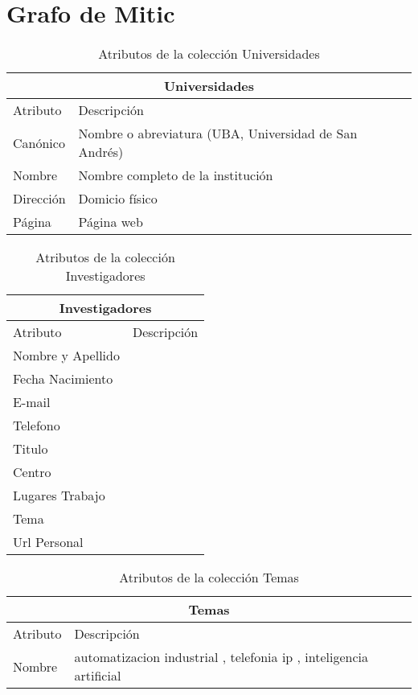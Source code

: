 \chapter{Grafo de Mitic}
\label{chap:db}

\begin{center}
\begin{table}[H]
\centering
\begin{tabular}{| l | l |}
\hline
\multicolumn{2}{|c|}{Universidades} \\ \hline
Atributo & Descripción \\ \hline
Canónico & Nombre o abreviatura (UBA, Universidad de San Andrés)\\ \hline
Nombre& Nombre completo de la institución\\ \hline
Dirección & Domicio físico\\ \hline
Página & Página web\\ \hline
\end{tabular}
\caption{Atributos de la colección Universidades}
\label{table:universidades}
\end{table}
\end{center}

\begin{center}
\begin{table}[H]
\centering
\begin{tabular}{| l | l |}
\hline
\multicolumn{2}{|c|}{Investigadores} \\ \hline
Atributo & Descripción \\ \hline
	Nombre y Apellido & \\ \hline
	Fecha Nacimiento & \\ \hline
	E-mail & \\ \hline
  Telefono & \\ \hline
  Titulo & \\ \hline
  Centro & \\ \hline
	Lugares Trabajo & \\ \hline
	Tema & \\ \hline
	Url Personal & \\ \hline
\end{tabular}
\caption{Atributos de la colección Investigadores}
\label{table:investigadores}
\end{table}
\end{center}

\begin{center}
\begin{table}[H]
\centering
\begin{tabular}{|  l | l |}
\hline
\multicolumn{2}{|c|}{Temas} \\ \hline
Atributo & Descripción \\ \hline
Nombre &  automatizacion industrial , telefonia ip , inteligencia artificial\\ \hline 
\end{tabular}
\caption{Atributos de la colección Temas}
\label{table:temas}
\end{table}
\end{center}

